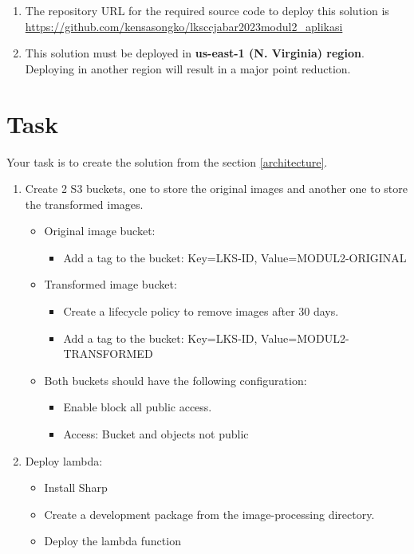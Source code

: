 \documentclass{article}
\begin{document}
\begin{enumerate}
\item The repository URL for the required source code to deploy this solution is \href{https://github.com/kensasongko/lksccjabar2023modul2_aplikasi}{https://github.com/kensasongko/lksccjabar2023modul2\_aplikasi}
\item This solution must be deployed in \textbf{us-east-1 (N. Virginia) region}. Deploying in another region will result in a major point reduction.
\end{enumerate}

\section{Task}
Your task is to create the solution from the section \ref{architecture}.
\begin{enumerate}
\item Create 2 S3 buckets, one to store the original images and another one to store the transformed images.
  \begin{itemize}
    \item Original image bucket:
    \begin{itemize}
      \item Add a tag to the bucket: Key=LKS-ID, Value=MODUL2-ORIGINAL
    \end{itemize}
    \item Transformed image bucket:
    \begin{itemize}
      \item Create a lifecycle policy to remove images after 30 days.
      \item Add a tag to the bucket: Key=LKS-ID, Value=MODUL2-TRANSFORMED
    \end{itemize}
    \item Both buckets should have the following configuration:
    \begin{itemize}
      \item Enable block all public access.
      \item Access: Bucket and objects not public
    \end{itemize}
  \end{itemize}
\item Deploy lambda:
  \begin{itemize}
    \item Install Sharp
    \item Create a development package from the image-processing directory.
    \item Deploy the lambda function

\end{itemize}
\end{enumerate}
\end{document}
